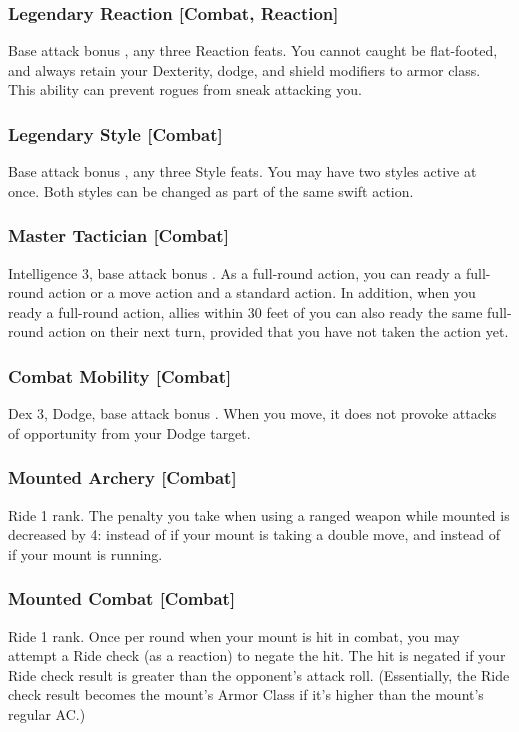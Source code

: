 \subsubsection{Legendary Reaction [Combat, Reaction]}
\featpre Base attack bonus , any three Reaction feats.
\featben You cannot caught be flat-footed, and always retain your Dexterity, dodge, and shield modifiers to armor class. This ability can prevent rogues from sneak attacking you.

\subsubsection{Legendary Style [Combat]}
\featpre Base attack bonus , any three Style feats.
\featben You may have two styles active at once. Both styles can be changed as part of the same swift action.

\subsubsection{Master Tactician [Combat]}
\featpre Intelligence 3, base attack bonus .
\featben As a full-round action, you can ready a full-round action or a move action and a standard action. In addition, when you ready a full-round action, allies within 30 feet of you can also ready the same full-round action on their next turn, provided that you have not taken the action yet.

\subsubsection{Combat Mobility [Combat]}
 Dex 3, Dodge, base attack bonus .
 When you move, it does not provoke attacks of opportunity from your Dodge target.

\subsubsection{Mounted Archery [Combat]}
\featpre Ride 1 rank.
 The penalty you take when using a ranged weapon while mounted is decreased by 4:  instead of  if your mount is taking a double move, and  instead of  if your mount is running.

\subsubsection{Mounted Combat [Combat]}
 Ride 1 rank.
 Once per round when your mount is hit in combat, you may attempt a Ride check (as a reaction) to negate the hit. The hit is negated if your Ride check result is greater than the opponent's attack roll. (Essentially, the Ride check result becomes the mount's Armor Class if it's higher than the mount's regular AC.)%

